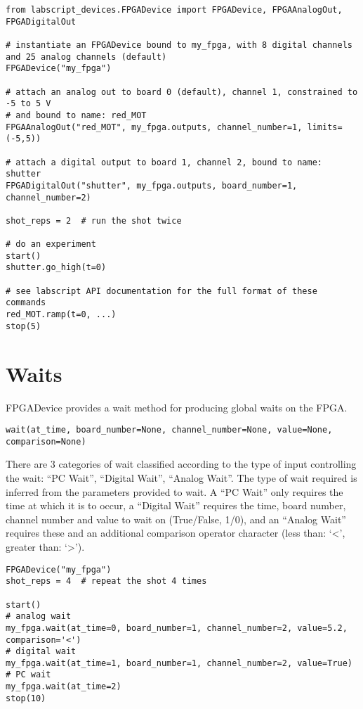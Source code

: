 \documentclass[11pt,a4paper]{article}
\begin{document}
\begin{verbatim}
from labscript_devices.FPGADevice import FPGADevice, FPGAAnalogOut, FPGADigitalOut

# instantiate an FPGADevice bound to my_fpga, with 8 digital channels and 25 analog channels (default)
FPGADevice("my_fpga")

# attach an analog out to board 0 (default), channel 1, constrained to -5 to 5 V
# and bound to name: red_MOT
FPGAAnalogOut("red_MOT", my_fpga.outputs, channel_number=1, limits=(-5,5))

# attach a digital output to board 1, channel 2, bound to name: shutter
FPGADigitalOut("shutter", my_fpga.outputs, board_number=1, channel_number=2)

shot_reps = 2  # run the shot twice

# do an experiment
start()
shutter.go_high(t=0)

# see labscript API documentation for the full format of these commands
red_MOT.ramp(t=0, ...)
stop(5)
\end{verbatim}

\section{Waits}
FPGADevice provides a wait method for producing global waits on the FPGA.

\begin{verbatim}
wait(at_time, board_number=None, channel_number=None, value=None, comparison=None)
\end{verbatim}

There are 3 categories of wait classified according to the type of input
controlling the wait: ``PC Wait'', ``Digital Wait'', ``Analog Wait''.
The type of wait required is inferred from the parameters provided to
wait. A ``PC Wait'' only requires the time at which it is to occur, a
``Digital Wait'' requires the time, board number, channel number and
value to wait on (True/False, 1/0), and an ``Analog Wait'' requires
these and an additional comparison operator character (less than:
`\textless{}', greater than: `\textgreater{}').

\begin{verbatim}
FPGADevice("my_fpga")
shot_reps = 4  # repeat the shot 4 times

start()
# analog wait
my_fpga.wait(at_time=0, board_number=1, channel_number=2, value=5.2, comparison='<')
# digital wait
my_fpga.wait(at_time=1, board_number=1, channel_number=2, value=True)
# PC wait
my_fpga.wait(at_time=2)
stop(10)
\end{verbatim}
\end{document}
